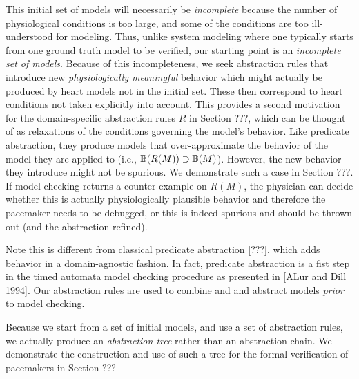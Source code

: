 This initial set of models will necessarily be \emph{incomplete} because the number of physiological conditions is too large, and some of the conditions are too ill-understood for modeling.
Thus, unlike system modeling where one typically starts from one ground truth model to be verified, our starting point is an \emph{incomplete set of models}.
Because of this incompleteness, we seek abstraction rules that introduce new \emph{physiologically meaningful} behavior which might actually be produced by heart models not in the initial set.
These then correspond to heart conditions not taken explicitly into account. 
This provides a second motivation for the domain-specific abstraction rules $R$ in Section ???, which can be thought of as relaxations of the conditions governing the model's behavior. 
Like predicate abstraction, they produce models that over-approximate the behavior of the model they are applied to (i.e., $\mathbb{B}(R(M)) \supset \mathbb{B}(M)$).
However, the new behavior they introduce might not be spurious. 
We demonstrate such a case in Section ???.
If model checking returns a counter-example on $R(M)$, the physician can decide whether this is actually physiologically plausible behavior and therefore the pacemaker needs to be debugged, or this is indeed spurious and should be thrown out (and the abstraction refined).

Note this is different from classical predicate abstraction [???], which adds behavior in a domain-agnostic fashion. In fact, predicate abstraction is a fist step in the timed automata model checking procedure as presented in [ALur and Dill 1994].
Our abstraction rules are used to combine and and abstract models \emph{prior} to model checking.
%

Because we start from a set of initial models, and use a set of abstraction rules, we actually produce an \emph{abstraction tree} rather than an abstraction chain.
We demonstrate the construction and use of such a tree for the formal verification of pacemakers in Section ???

